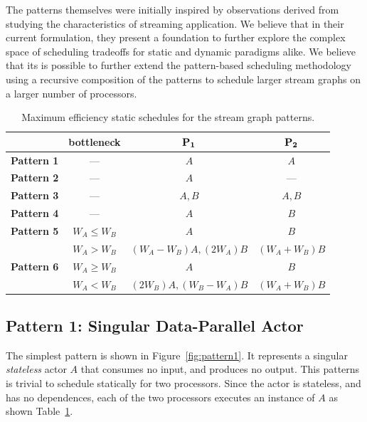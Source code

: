 The patterns themselves were initially inspired by observations
derived from studying the characteristics of streaming application. We
believe that in their current formulation, they present a foundation
to further explore the complex space of scheduling tradeoffs for
static and dynamic paradigms alike.  We believe that its is possible
to further extend the pattern-based scheduling methodology using a
recursive composition of the patterns to schedule larger stream graphs
on a larger number of processors.

\begin{table}[t]
\center
\caption{\small Maximum efficiency static schedules for the stream graph patterns.}
{\small
\begin{tabular}{|c|c|c|c|} \hline
                 & {\bf bottleneck} & ${\bf P_1}$  & ${\bf P_2}$ \\ \hline
{\bf Pattern 1}  & ---              & $A$     & $A$ \\ \hline
{\bf Pattern 2}  & ---              & $A$     & --- \\ \hline
{\bf Pattern 3}  & ---              & $A, B$  & $A, B$ \\ \hline
{\bf Pattern 4}  & ---              & $A$     & $B$ \\ \hline
{\bf Pattern 5}  & $W_A \le W_B$    & $A$     & $B$ \\ \cline{2-4}
                 & $W_A > W_B$      & $(W_A - W_B) A, (2W_A) B$ & $(W_A + W_B) B$ \\ \hline
{\bf Pattern 6}  & $W_A \ge W_B$    & $A$     & $B$ \\ \cline{2-4}
                 & $W_A < W_B$      & $(2W_B) A, (W_B - W_A) B$ & $(W_A + W_B) B$ \\ \hline
\end{tabular}}
\label{tab:pattern-sched}
\end{table}


\subsection{Pattern 1: Singular Data-Parallel Actor}

The simplest pattern is shown in Figure~\ref{fig:pattern1}. It
represents a singular {\it stateless} actor $A$ that consumes no
input, and produces no output.
This patterns is trivial to schedule statically for two
processors. Since the actor is stateless, and has no dependences, each
of the two processors executes an instance of $A$ as shown Table~\ref{tab:pattern-sched}.

